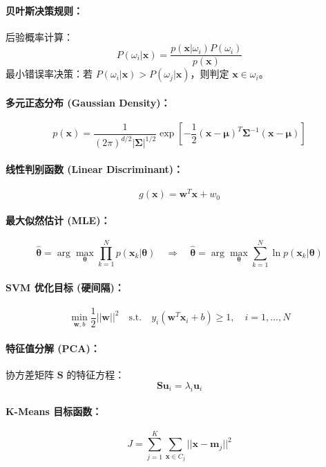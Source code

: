 \documentclass[a4paper, 11pt]{ctexart}
\begin{document}
\paragraph{贝叶斯决策规则：}
后验概率计算：
$$ P(\omega_i | \bm{x}) = \frac{p(\bm{x} | \omega_i) P(\omega_i)}{p(\bm{x})} $$
最小错误率决策：若 $P(\omega_i|\bm{x}) > P(\omega_j|\bm{x})$，则判定 $\bm{x} \in \omega_i$。

\paragraph{多元正态分布 (Gaussian Density)：}
$$ p(\bm{x}) = \frac{1}{(2\pi)^{d/2} |\bm{\Sigma}|^{1/2}} \exp \left[ -\frac{1}{2} (\bm{x} - \bm{\mu})^T \bm{\Sigma}^{-1} (\bm{x} - \bm{\mu}) \right] $$

\paragraph{线性判别函数 (Linear Discriminant)：}
$$ g(\bm{x}) = \bm{w}^T \bm{x} + w_0 $$

\paragraph{最大似然估计 (MLE)：}
$$ \hat{\bm{\theta}} = \arg \max_{\bm{\theta}} \prod_{k=1}^{N} p(\bm{x}_k | \bm{\theta}) \quad \Rightarrow \quad \hat{\bm{\theta}} = \arg \max_{\bm{\theta}} \sum_{k=1}^{N} \ln p(\bm{x}_k | \bm{\theta}) $$

\paragraph{SVM 优化目标 (硬间隔)：}
$$ \min_{\bm{w}, b} \frac{1}{2} ||\bm{w}||^2 \quad \text{s.t.} \quad y_i(\bm{w}^T \bm{x}_i + b) \ge 1, \quad i=1,\dots,N $$

\paragraph{特征值分解 (PCA)：}
协方差矩阵 $\bm{S}$ 的特征方程：
$$ \bm{S} \bm{u}_i = \lambda_i \bm{u}_i $$

\paragraph{K-Means 目标函数：}
$$ J = \sum_{j=1}^{K} \sum_{\bm{x} \in C_j} ||\bm{x} - \bm{m}_j||^2 $$
\end{document}
